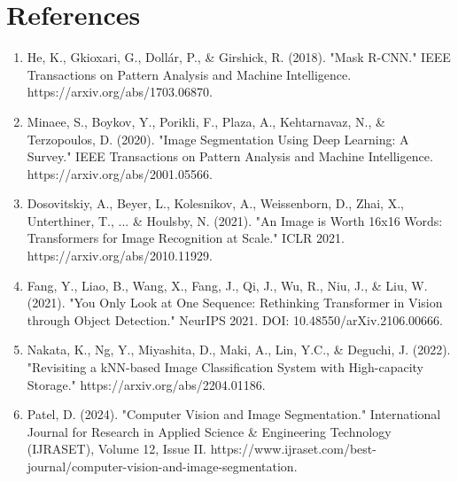 
\chapter{References}
\begin{enumerate}
  \item He, K., Gkioxari, G., Dollár, P., \& Girshick, R. (2018). "Mask R-CNN." IEEE Transactions on Pattern Analysis and Machine Intelligence. https://arxiv.org/abs/1703.06870.
  \item Minaee, S., Boykov, Y., Porikli, F., Plaza, A., Kehtarnavaz, N., \& Terzopoulos, D. (2020). "Image Segmentation Using Deep Learning: A Survey." IEEE Transactions on Pattern Analysis and Machine Intelligence. https://arxiv.org/abs/2001.05566.
  \item Dosovitskiy, A., Beyer, L., Kolesnikov, A., Weissenborn, D., Zhai, X., Unterthiner, T., ... \& Houlsby, N. (2021). "An Image is Worth 16x16 Words: Transformers for Image Recognition at Scale." ICLR 2021. https://arxiv.org/abs/2010.11929.
  \item Fang, Y., Liao, B., Wang, X., Fang, J., Qi, J., Wu, R., Niu, J., \& Liu, W. (2021). "You Only Look at One Sequence: Rethinking Transformer in Vision through Object Detection." NeurIPS 2021. DOI: 10.48550/arXiv.2106.00666.
  \item Nakata, K., Ng, Y., Miyashita, D., Maki, A., Lin, Y.C., \& Deguchi, J. (2022). "Revisiting a kNN-based Image Classification System with High-capacity Storage." https://arxiv.org/abs/2204.01186.
  \item Patel, D. (2024). "Computer Vision and Image Segmentation." International Journal for Research in Applied Science \& Engineering Technology (IJRASET), Volume 12, Issue II. https://www.ijraset.com/best-journal/computer-vision-and-image-segmentation.
\end{enumerate}